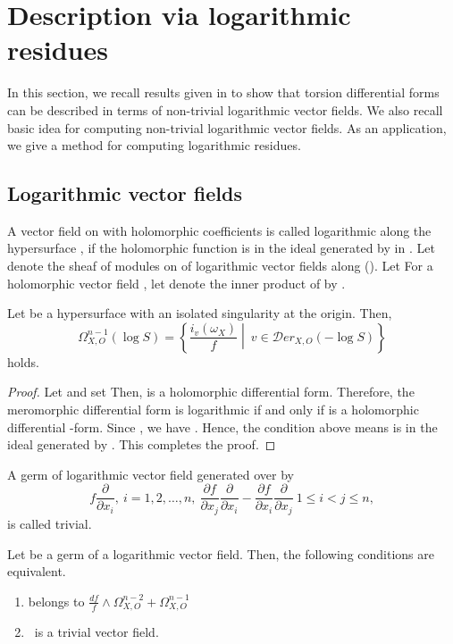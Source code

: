 \documentclass{arxsigma}
\begin{document}
\section{Description via logarithmic residues}
In this section, we recall results given in \cite{TN20} to show that torsion differential forms can be described
in terms of non-trivial logarithmic vector fields. We also recall basic idea for computing non-trivial logarithmic vector fields. As an application,
we give a method for computing logarithmic residues.
\subsection{Logarithmic vector fields}
A vector field   on   with holomorphic coefficients is called
logarithmic
along the hypersurface  , if the holomorphic function   is in the ideal   generated by   in
 . Let   denote the sheaf of modules on   of logarithmic
vector fields along   (\cite{S}).
Let   For a holomorphic vector field  ,
let   denote the inner product of   by  .
\begin{proposition}
Let   be a hypersurface with an isolated singularity at the origin. Then,
\begin{equation*}
\Omega_{X, O}^{n-1}(\log S) = \left\{ \frac{i_{v}(\omega_X)}{f} \middle| \ v \in{\mathcal Der}_{X, O}(-\log S) \right\}
\end{equation*}
holds.
\end{proposition}
\begin{proof}
Let   and set   Then,   is a holomorphic differential form. Therefore, the meromorphic differential   form
  is logarithmic if and only if   is a holomorphic differential  -form.
Since  , we have  . Hence, the condition above means   is in the ideal   generated by  .
This completes the proof.
\end{proof}
A germ of logarithmic vector field   generated over   by
\begin{equation*}
f\frac{\partial}{\partial x_i}, \ i=1,2,\ldots,n, \ \frac{\partial f}{\partial x_j}\frac{\partial}{\partial x_i} - \frac{\partial f}{\partial x_i}\frac{\partial}{\partial x_j}
\ 1 \leq i
< j \leq n,
\end{equation*}
is called trivial.
\begin{lemma}
Let   be a germ of a logarithmic vector field. Then, the following conditions are equivalent.
\begin{enumerate}
\item
  belongs to
$\frac{df}{f} \wedge \Omega_{X,O}^{n-2}+
\Omega_{X,O}^{n-1}$
\item \   is a trivial vector field.
\end{enumerate}
\end{lemma}
\end{document}

